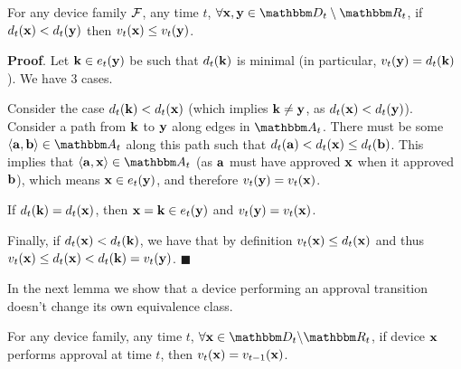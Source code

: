 \begin{lemma}
  For any device family $\mathcal{F}$, any time $t$, $\forall \zdev{x},\zdev{y} \in \zset{d}_t \setminus \zset{R}_t$, 
  if $d_t(\mathbf{x}) < d_t(\mathbf{y})$ then 
  $v_t(\mathbf{x}) \le v_t(\mathbf{y})$.
  \label{l:verif_ineq}
\end{lemma}

\textbf{Proof}. Let $\mathbf{k} \in e_t(\mathbf{y})$ be such that
$d_{t}(\mathbf{k})$ is minimal (in particular, $v_{t}(\mathbf{y}) = d_{t}(\mathbf{k})$). We have 3 cases.

Consider the case $d_{t}(\mathbf{k}) < d_{t}(\mathbf{x})$ (which implies $\mathbf{k} \neq \mathbf{y}$, as
$d_{t}(\mathbf{x}) < d_{t}(\mathbf{y})$). Consider a path from $\mathbf{k}$ to $\mathbf{y}$ along edges in
$\zset{a}_t$. There must be some $\langle \zdev{a}, \zdev{b} \rangle \in \zset{a}_t$ along this path
such that $d_{t}(\mathbf{a}) < d_{t}(\mathbf{x}) \le d_{t}(\mathbf{b})$. This implies that $\langle
\zdev{a}, \zdev{x} \rangle \in \zset{a}_t$ (as $\mathbf{a}$ must have approved $\mathbf{x}$ when it
approved $\mathbf{b}$), which means $\mathbf{x} \in e_t(\mathbf{y})$, and therefore $v_{t}(\mathbf{y}) =
v_{t}(\mathbf{x})$.

If $d_{t}(\mathbf{k}) = d_{t}(\mathbf{x})$, then $\mathbf{x} = \mathbf{k} \in e_t(\mathbf{y})$ and
$v_{t}(\mathbf{y}) = v_{t}(\mathbf{x})$.

Finally, if $d_{t}(\mathbf{x}) < d_{t}(\mathbf{k})$, we have that by definition $v_{t}(\mathbf{x}) \leq d_{t}(\mathbf{x})$ and thus 
$v_{t}(\mathbf{x}) \leq d_{t}(\mathbf{x}) < d_{t}(\mathbf{k}) = v_{t}(\mathbf{y})$. $\blacksquare$

In the next lemma we show that a device performing an approval transition doesn't change its own
  equivalence class.

  \begin{lemma}
    For any device family, any time $t$, $\forall \zdev{x} \in \zactive{t}$, 
    if device $\mathbf{x}$ performs approval at time $t$,
    then $v_{t}(\mathbf{x}) = v_{t-1}(\mathbf{x})$.
    \label{l:nochange}
 \end{lemma}
 
